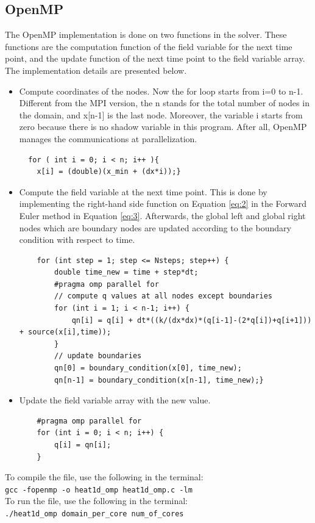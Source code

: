 \documentclass[12pt]{article}
\begin{document}
\subsection{OpenMP}
The OpenMP implementation is done on two functions in the solver. These functions are the computation function of the field variable for the next time point, and the update function of the next time point to the field variable array. The implementation details are presented below.
\begin{itemize}
\item Compute coordinates of the nodes. Now the for loop starts from i=0 to n-1. Different from the MPI version, the n stands for the total number of nodes in the domain, and x[n-1] is the last node. Moreover, the variable i starts from zero because there is no shadow variable in this program. After all, OpenMP manages the communications at parallelization.
    \begin{verbatim}
  for ( int i = 0; i < n; i++ ){
    x[i] = (double)(x_min + (dx*i));}
    \end{verbatim}
    \item Compute the field variable at the next time point. This is done by implementing the right-hand side function on Equation \ref{eq:2} in the Forward Euler method in Equation \ref{eq:3}. Afterwards, the global left and global right nodes which are boundary nodes are updated according to the boundary condition with respect to time.
    \begin{verbatim}
    for (int step = 1; step <= Nsteps; step++) {
        double time_new = time + step*dt; 
        #pragma omp parallel for
        // compute q values at all nodes except boundaries
        for (int i = 1; i < n-1; i++) {
            qn[i] = q[i] + dt*((k/(dx*dx)*(q[i-1]-(2*q[i])+q[i+1])) + source(x[i],time));
        }
        // update boundaries
        qn[0] = boundary_condition(x[0], time_new);
        qn[n-1] = boundary_condition(x[n-1], time_new);}
    \end{verbatim}
    \item Update the field variable array with the new value.
    \begin{verbatim}
    #pragma omp parallel for
    for (int i = 0; i < n; i++) {
        q[i] = qn[i];
    }
    \end{verbatim}
\end{itemize}
\noindent
To compile the file, use the following in the terminal:\\
\texttt{gcc -fopenmp -o heat1d\_omp heat1d\_omp.c -lm}\\
To run the file, use the following in the terminal:\\
\texttt{./heat1d\_omp domain\_per\_core num\_of\_cores}\\
\newpage
\end{document}
